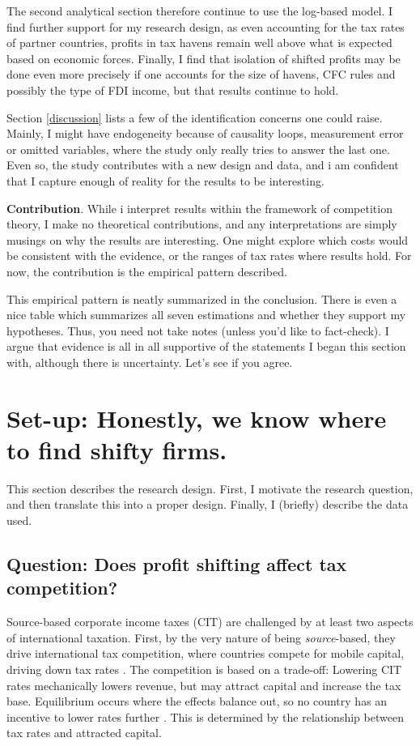 \documentclass[twoside,a4paper,11pt]{article}
\begin{document}
The second analytical section therefore continue to use the log-based model. I find further support for my research design, as even accounting for the tax rates of partner countries,  profits in tax havens remain well above what is expected based on economic forces. Finally, I find that isolation of shifted profits may be done even more precisely if one accounts for the size of havens, CFC rules and possibly the type of FDI income, but that results continue to hold. 

Section \ref{discussion} lists a few of the identification concerns one could raise. Mainly, I might have endogeneity because of causality loops, measurement error or omitted variables, where the study only really tries to answer the last one. Even so, the study contributes with a new design and data, and i am confident that I capture enough of reality for the results to be interesting. 

\textbf{Contribution}. While i interpret results within the framework of competition theory, I make no theoretical contributions, and any interpretations are simply musings on why the results are interesting. One might explore which costs would be consistent with the evidence, or the ranges of tax rates where results hold. For now, the contribution is the empirical pattern described.

This empirical pattern is neatly summarized in the conclusion. There is even a nice table which summarizes all seven estimations and whether they support  my hypotheses. Thus, you need not take notes (unless you'd like to fact-check). I argue that evidence is all in all supportive of the statements I began this section with, although there is uncertainty. Let's see if you agree. 



\section{Set-up: Honestly, we know where to find shifty firms.}\label{setup}
This section describes the research design. First, I motivate the research question, and then translate this into a proper design. Finally, I (briefly) describe the data used. 

\subsection{Question: Does profit shifting affect tax competition?}
Source-based corporate income taxes (CIT) are challenged by at least two aspects of international taxation. First, by the very nature of being \textit{source}-based, they drive international tax competition, where countries compete for mobile capital, driving down tax rates \autocite{keen_theory_2013}. The competition is based on a trade-off: Lowering CIT rates mechanically lowers revenue, but may attract capital and increase the tax base. Equilibrium occurs where the effects balance out, so no country has an incentive to lower rates further \autocite[267]{keen_theory_2013}. This is determined by the relationship between tax rates and attracted capital.
\end{document}
